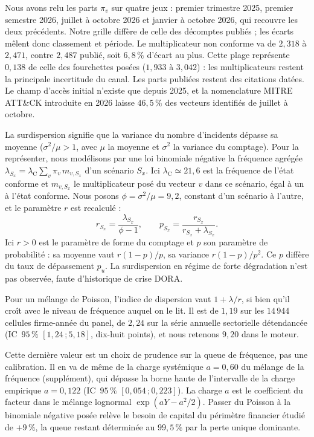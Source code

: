 Nous avons relu les parts $\pi_v$ sur quatre jeux : premier trimestre 2025, premier semestre 2026,
juillet à octobre 2026 et janvier à octobre 2026, qui recouvre les deux précédents. Notre grille diffère
de celle des décomptes publiés ; les écarts mêlent donc classement et période. Le multiplicateur
non conforme va de $2{,}318$ à $2{,}471$, contre $2{,}487$ publié, soit $6{,}8\,\%$ d'écart au plus.
Cette plage représente $0{,}138$ de celle des fourchettes posées ($1{,}933$ à $3{,}042$) : les
multiplicateurs restent la principale incertitude du canal. Les parts publiées restent des citations
datées. Le champ d'accès initial n'existe que depuis 2025, et la nomenclature MITRE ATT\&CK
introduite en 2026 laisse $46{,}5\,\%$ des vecteurs identifiés de juillet à octobre.

La surdispersion signifie que la variance du nombre d'incidents dépasse sa moyenne ($\sigma^2/\mu > 1$, avec $\mu$ la moyenne et $\sigma^2$ la variance du comptage). Pour la représenter, nous modélisons par une loi binomiale négative la fréquence agrégée
$\lambda_{S_x} = \lambda_{\text{C}}\sum_v \pi_v\, m_{v,S_x}$ d'un scénario $S_x$. Ici $\lambda_{\text{C}}\simeq 21{,}6$ est la fréquence de l'état conforme et $m_{v,S_x}$ le multiplicateur posé du vecteur $v$ dans ce scénario, égal à un à l'état conforme. Nous posons $\phi = \sigma^2/\mu = 9{,}2$, constant d'un scénario à l'autre, et le paramètre
$r$ est recalculé :
\begin{equation}
r_{S_x} = \frac{\lambda_{S_x}}{\phi - 1},
\qquad
p_{S_x} = \frac{r_{S_x}}{r_{S_x} + \lambda_{S_x}}.
\end{equation}
Ici $r>0$ est le paramètre de forme du comptage et $p$ son paramètre de probabilité : sa moyenne vaut $r(1-p)/p$, sa variance $r(1-p)/p^2$. Ce $p$ diffère du taux de dépassement $p_u$. La surdispersion en régime de forte dégradation n'est pas observée, faute
d'historique de crise DORA.

Pour un mélange de Poisson, l'indice de dispersion vaut $1+\lambda/r$, si bien qu'il croît avec le
niveau de fréquence auquel on le lit. Il est de $1{,}19$ sur les $14\,944$ cellules firme-année du
panel, de $2{,}24$ sur la série annuelle sectorielle détendancée (IC~$95\,\%$ $[1{,}24\,;5{,}18]$,
dix-huit points), et nous retenons $9{,}20$ dans le moteur.

Cette dernière valeur est un choix de prudence sur la queue de fréquence, pas une calibration. Il
en va de même de la charge systémique $a=0{,}60$ du mélange de la fréquence (supplément), qui dépasse la
borne haute de l'intervalle de la charge empirique $a=0{,}122$ (IC~$95\,\%$ $[0{,}054\,;0{,}223]$).
La charge $a$ est le coefficient du facteur dans le mélange lognormal $\exp(aY-a^2/2)$. Passer du Poisson à la
binomiale négative posée relève le besoin de capital du périmètre financier étudié de $+9\,\%$, la queue
restant déterminée au $99{,}5\,\%$ par la perte unique dominante.

